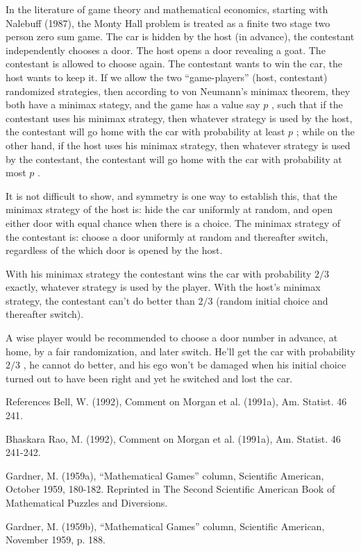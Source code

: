 In the literature of game theory and mathematical economics, starting with Nalebuff (1987), the Monty Hall problem is treated as a finite two stage two person zero sum game. The car is hidden by the host (in advance), the contestant independently chooses a door. The host opens a door revealing a goat. The contestant is allowed to choose again. The contestant wants to win the car, the host wants to keep it. If we allow the two ``game-players'' (host, contestant) randomized strategies, then according to von Neumann's minimax theorem, they both have a minimax stategy, and the game has a value say $ p$ , such that if the contestant uses his minimax strategy, then whatever strategy is used by the host, the contestant will go home with the car with probability at least $ p$ ; while on the other hand, if the host uses his minimax strategy, then whatever strategy is used by the contestant, the contestant will go home with the car with probability at most $ p$ .

It is not difficult to show, and symmetry is one way to establish this, that the minimax strategy of the host is: hide the car uniformly at random, and open either door with equal chance when there is a choice. The minimax strategy of the contestant is: choose a door uniformly at random and thereafter switch, regardless of the which door is opened by the host.

With his minimax strategy the contestant wins the car with probability $ 2/3$ exactly, whatever strategy is used by the player. With the host's minimax strategy, the contestant can't do better than $ 2/3$ (random initial choice and thereafter switch).

A wise player would be recommended to choose a door number in advance, at home, by a fair randomization, and later switch. He'll get the car with probability $ 2/3$ , he cannot do better, and his ego won't be damaged when his initial choice turned out to have been right and yet he switched and lost the car.

References
Bell, W. (1992), Comment on Morgan et al. (1991a), Am. Statist. 46 241.

Bhaskara Rao, M. (1992), Comment on Morgan et al. (1991a), Am. Statist. 46 241-242.

Gardner, M. (1959a), ``Mathematical Games'' column, Scientific American, October 1959, 180-182. Reprinted in The Second Scientific American Book of Mathematical Puzzles and Diversions.

Gardner, M. (1959b), ``Mathematical Games'' column, Scientific American, November 1959, p. 188.

